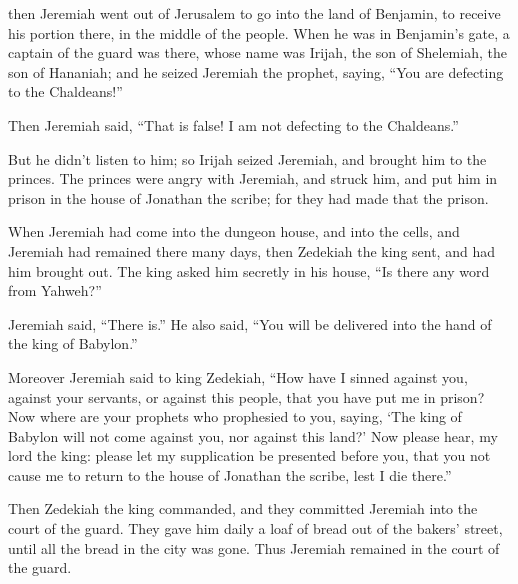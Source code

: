 {then Jeremiah went out of Jerusalem to go into the land of Benjamin, to receive his portion there, in the middle of the people.
When he was in Benjamin’s gate, a captain of the guard was there, whose name was Irijah, the son of Shelemiah, the son of Hananiah; and he seized Jeremiah the prophet, saying, “You are defecting to the Chaldeans!”
\par }{\PP {}Then Jeremiah said, “That is false! I am not defecting to the Chaldeans.”
\par }{\PP But he didn’t listen to him; so Irijah seized Jeremiah, and brought him to the princes.
The princes were angry with Jeremiah, and struck him, and put him in prison in the house of Jonathan the scribe; for they had made that the prison.
\par }{\PP {}When Jeremiah had come into the dungeon house, and into the cells, and Jeremiah had remained there many days,
then Zedekiah the king sent, and had him brought out. The king asked him secretly in his house, “Is there any word from Yahweh?”
\par }{\PP Jeremiah said, “There is.” He also said, “You will be delivered into the hand of the king of Babylon.”
\par }{\PP {}Moreover Jeremiah said to king Zedekiah, “How have I sinned against you, against your servants, or against this people, that you have put me in prison?
Now where are your prophets who prophesied to you, saying, ‘The king of Babylon will not come against you, nor against this land?’
Now please hear, my lord the king: please let my supplication be presented before you, that you not cause me to return to the house of Jonathan the scribe, lest I die there.”
\par }{\PP {}Then Zedekiah the king commanded, and they committed Jeremiah into the court of the guard. They gave him daily a loaf of bread out of the bakers’ street, until all the bread in the city was gone. Thus Jeremiah remained in the court of the guard.

}
